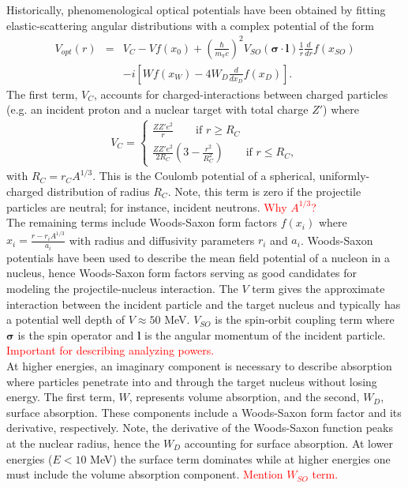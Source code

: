 \documentclass[preprintnumbers,floatfix,aps,prc,preprint,nofootinbib]{revtex4-1}
\begin{document}
Historically, phenomenological optical potentials have been obtained by fitting elastic-scattering angular distributions with a complex potential of the form
%
\begin{eqnarray}
	\label{eq:phenomenological_optical_potential}
	V_{opt}(r) &=& V_C - V f(x_0) + (\frac{\hbar}{m_{\pi} c})^2 V_{SO}(\bm{\sigma} \cdot \textbf{l}) \frac{1}{r} \frac{d}{dr} f(x_{SO}) \nonumber \\ 
& &- i [W f(x_W) - 4 W_D \frac{d}{dx_D} f(x_D)].
\end{eqnarray}
%
The first term, $V_C$, accounts for charged-interactions between charged particles (e.g. an incident proton and a nuclear target with total charge $Z'$) where
%
\begin{eqnarray}
	\label{eq:coulomb_potential}
	V_C =
	\begin{cases}
		\frac{Z Z' e^2}{r} \qquad \text{if $r \geq R_C$} \\
		\frac{Z Z' e^2}{2 R_C} (3 - \frac{r^2}{R_C^2}) \qquad \text{if $r \leq R_C$},
	\end{cases}
\end{eqnarray}
%
with $R_C = r_C A^{1/3}$. This is the Coulomb potential of a spherical, uniformly-charged distribution of radius $R_C$. Note, this term is zero if the projectile particles are neutral; for instance, incident neutrons. \textcolor{red}{Why $A^{1/3}$?}
\\

The remaining terms include Woods-Saxon form factors $f(x_i)$ where $x_i = \frac{r-r_i A^{1/3}}{a_i}$ with radius and diffusivity parameters $r_i$ and $a_i$. Woods-Saxon potentials have been used to describe the mean field potential of a nucleon in a nucleus, hence Woods-Saxon form factors serving as good candidates for modeling the projectile-nucleus interaction. The $V$ term gives the approximate interaction between the incident particle and the target nucleus and typically has a potential well depth of $V \approx 50$ MeV. $V_{SO}$ is the spin-orbit coupling term where $\bm{\sigma}$ is the spin operator and $\bm{l}$ is the angular momentum of the incident particle. \textcolor{red}{Important for describing analyzing powers.}
\\

At higher energies, an imaginary component is necessary to describe absorption where particles penetrate into and through the target nucleus without losing energy. The first term, $W$, represents volume absorption, and the second, $W_D$, surface absorption. These components include a Woods-Saxon form factor and its derivative, respectively. Note, the derivative of the Woods-Saxon function peaks at the nuclear radius, hence the $W_D$ accounting for surface absorption. At lower energies ($E < 10$ MeV) the surface term dominates while at higher energies one must include the volume absorption component. \textcolor{red}{Mention $W_{SO}$ term.}
\\
\end{document}
